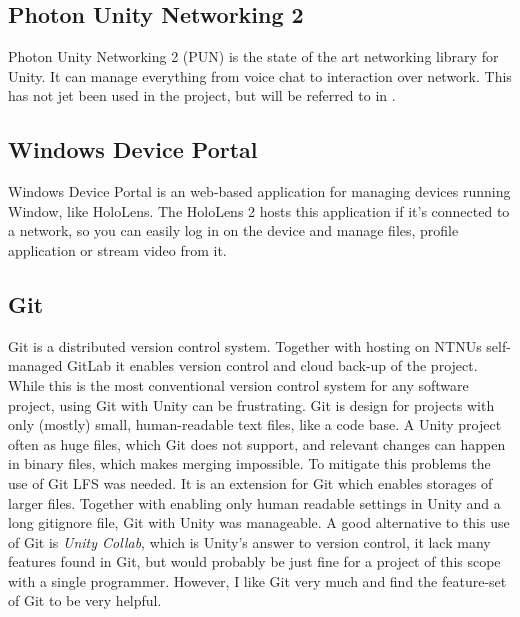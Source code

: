\subsection*{Photon Unity Networking 2}\label{chap:pun}
Photon Unity Networking 2 (PUN) is the state of the art networking library for Unity. It can manage everything from voice chat to interaction over network. This has not jet been used in the project, but will be referred to in . 

\subsection*{Windows Device Portal}\label{chap:wdp}

Windows Device Portal is an web-based application for managing devices running Window, like HoloLens. The HoloLens 2 hosts this application if it's connected to a network, so you can easily log in on the device and manage files, profile application or stream video from it.


\subsection*{Git}\label{chap:git}
Git is a distributed version control system. Together with hosting on NTNUs self-managed GitLab it enables version control and cloud back-up of the project. While this is the most conventional version control system for any software project, using Git with Unity can be frustrating. 
Git is design for projects with only (mostly) small, human-readable text files, like a code base. A Unity project often as huge files, which Git does not support, and relevant changes can happen in binary files, which makes merging impossible. To mitigate this problems the use of Git LFS was needed. It is an extension for Git which enables storages of larger files. Together with enabling only human readable settings in Unity and a long gitignore file, Git with Unity was manageable.
A good alternative to this use of Git is \textit{Unity Collab}, which is Unity's answer to version control, it lack many features found in Git, but would probably be just fine for a project of this scope with a single programmer. However, I like Git very much and find the feature-set of Git to be very helpful. 



